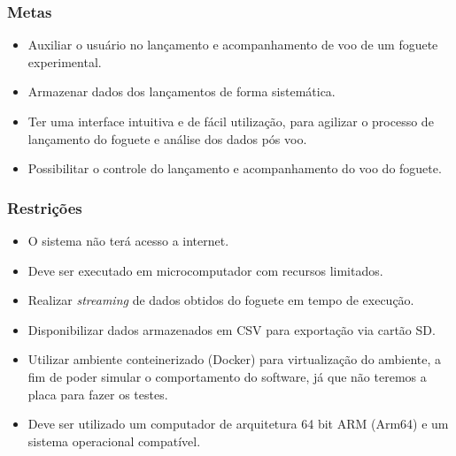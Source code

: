 \subsubsection{Metas}
\begin{itemize}
    \item Auxiliar o usuário no lançamento e acompanhamento de voo de um foguete experimental.
    \item Armazenar dados dos lançamentos de forma sistemática.
    \item Ter uma interface intuitiva e de fácil utilização, para agilizar o processo de lançamento do foguete e análise dos dados pós voo.
    \item Possibilitar o controle do lançamento e acompanhamento do voo do foguete.
\end{itemize}

\subsubsection{Restrições}
\begin{itemize}
    \item O sistema não terá acesso a internet.
    \item Deve ser executado em microcomputador com recursos limitados.
    \item Realizar  \textit{streaming} de dados obtidos do foguete em tempo de execução.
    \item Disponibilizar dados armazenados em CSV para exportação via cartão SD.
    \item Utilizar ambiente conteinerizado (Docker) para virtualização do ambiente, a fim de poder simular o comportamento do software, já que não teremos a placa para fazer os testes.
    \item Deve ser utilizado um computador de arquitetura 64 bit ARM (Arm64) e um sistema operacional compatível.
\end{itemize}












